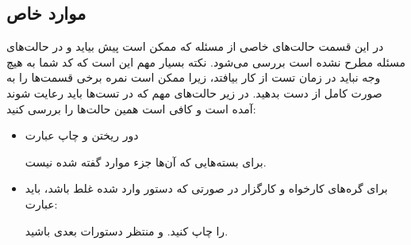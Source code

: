 \subsection{موارد خاص}
در این قسمت حالت‌های خاصی از مسئله که ممکن است پیش بیاید و در حالت‌های مسئله مطرح نشده است بررسی می‌شود. نکته بسیار مهم این است که کد شما به هیچ وجه نباید در زمان تست از کار بیافتد، زیرا ممکن است نمره برخی قسمت‌ها را به صورت کامل از دست بدهید.
در زیر حالت‌های مهم که در تست‌ها باید رعایت شوند آمده است و کافی است همین حالت‌ها را بررسی کنید:
\begin{itemize}
\item
دور ریختن و چاپ عبارت 
\begin{flushleft}
\end{flushleft}
برای بسته‌هایی که 
آن‌ها جزء موارد گفته شده نیست.

\item
برای گره‌های کارخواه و کارگزار در صورتی که دستور وارد شده غلط باشد، باید عبارت:
\begin{flushleft}
\end{flushleft}
را چاپ کنید. و منتظر دستورات بعدی باشید.

\end{itemize}
